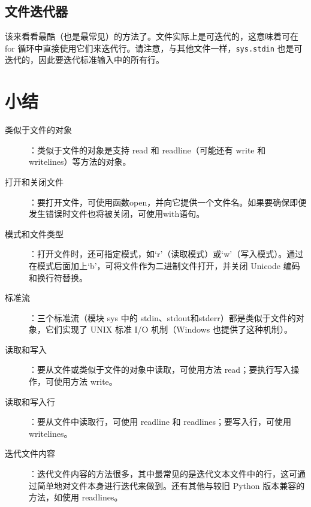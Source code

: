 \subsection{文件迭代器}
该来看看最酷（也是最常见）的方法了。文件实际上是可迭代的，这意味着可在 for 循环中直接使用它们来迭代行。请注意，与其他文件一样，\verb|sys.stdin| 也是可迭代的，因此要迭代标准输入中的所有行。
\section{小结}
\begin{description}
    \item[类似于文件的对象]：类似于文件的对象是支持 read 和 readline（可能还有 write 和 writelines）等方法的对象。
    \item[打开和关闭文件]：要打开文件，可使用函数open，并向它提供一个文件名。如果要确保即便发生错误时文件也将被关闭，可使用with语句。
    \item[模式和文件类型]：打开文件时，还可指定模式，如`r'（读取模式）或`w'（写入模式）。通过在模式后面加上`b'，可将文件作为二进制文件打开，并关闭 Unicode 编码和换行符替换。
    \item[标准流]：三个标准流（模块 sys 中的 stdin、stdout和stderr）都是类似于文件的对象，它们实现了 UNIX 标准 I/O 机制（Windows 也提供了这种机制）。
    \item[读取和写入]：要从文件或类似于文件的对象中读取，可使用方法 read；要执行写入操作，可使用方法 write。
    \item[读取和写入行]：要从文件中读取行，可使用 readline 和 readlines；要写入行，可使用 writelines。
    \item[迭代文件内容]：迭代文件内容的方法很多，其中最常见的是迭代文本文件中的行，这可通过简单地对文件本身进行迭代来做到。还有其他与较旧 Python 版本兼容的方法，如使用 readlines。
\end{description}